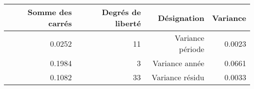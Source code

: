 \begin{tabular}{rrrr}
\toprule
    \textbf{Somme des carrés} & \textbf{Degrés de liberté} & \textbf{Désignation} & \textbf{Variance} \\
\midrule
    0.0252 & 11 & Variance période & 0.0023 \\ 
    0.1984 & 3 & Variance année & 0.0661 \\ 
    0.1082 & 33 & Variance résidu & 0.0033 \\
\bottomrule 
\end{tabular}